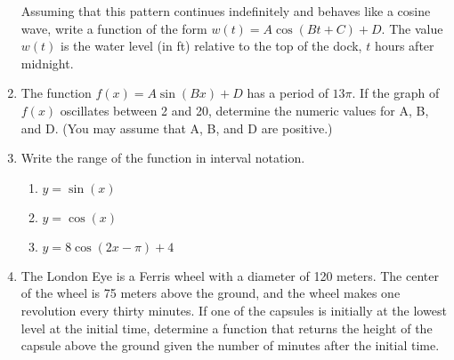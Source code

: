 \begin{enumerate}
  Assuming that this pattern continues indefinitely and behaves like a
  cosine wave, write a function of the form $w(t)=A\cos(Bt+C)+D$.  The
  value $w(t)$ is the water level (in ft) relative to the top of the
  dock, $t$ hours after midnight.

  \vfill

\clearpage

\item The function $f(x)=A\sin(Bx)+D$ has a period of $13\pi$.  If the graph of $f(x)$ oscillates between 2 and 20, determine the numeric values for A, B, and D.  (You may assume that A, B, and D are positive.)
\vfill
\vfill

\item Write the range of the function in interval notation.
\begin{enumerate}
\item $y=\sin(x)$\\[0.2in]
\item $y=\cos(x)$\\[0.2in]
\item $y=8\cos(2x-\pi)+4$\vfill
\end{enumerate}

\clearpage


\item The London Eye is a Ferris wheel with a diameter of 120
  meters. The center of the wheel is 75 meters above the ground, and
  the wheel makes one revolution every thirty minutes. If one of the
  capsules is initially at the lowest level at the initial time,
  determine a function that returns the height of the capsule above
  the ground given the number of minutes after the initial time.

  \vfill


\end{enumerate}



